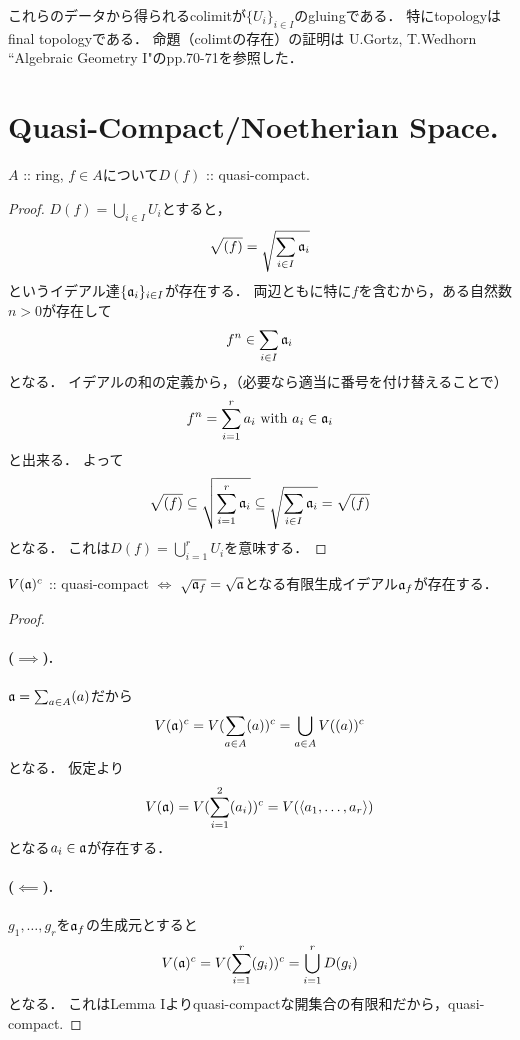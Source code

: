 \documentclass[a4paper]{jsarticle}
\begin{document}
    これらのデータから得られるcolimitが$\{U_i\}_{i \in I}$のgluingである．
    特にtopologyはfinal topologyである．
    命題（colimtの存在）の証明は
    U.Gortz, T.Wedhorn ``Algebraic Geometry I"のpp.70-71を参照した．

\section{Quasi-Compact/Noetherian Space.} %
    \begin{Lemma}[I]
        $A$ :: ring, $f \in A$について$D(f)$ :: quasi-compact.
    \end{Lemma}
    \begin{proof}
        $D(f)=\bigcup_{i \in I} U_i$とすると，
        \[ \sqrt{(f)}=\sqrt{\sum_{i \in I} \mathfrak{a}_i} \]
        というイデアル達$\{\mathfrak{a}_i\}_{i \in I}$が存在する．
        両辺ともに特に$f$を含むから，ある自然数$n>0$が存在して
        \[ f^n \in \sum_{i \in I} \mathfrak{a}_i \]
        となる．
        イデアルの和の定義から，（必要なら適当に番号を付け替えることで）
        \[ f^n=\sum_{i=1}^{r} a_i \text{ with } a_i \in \mathfrak{a}_i \]
        と出来る．
        よって
        \[
            \sqrt{(f)}
            \subseteq \sqrt{\sum_{i=1}^{r} \mathfrak{a}_i}
            \subseteq \sqrt{\sum_{i \in I} \mathfrak{a}_i}=\sqrt{(f)}
        \]
        となる．
        これは$D(f)=\bigcup_{i=1}^r U_i$を意味する．
    \end{proof}
    \begin{Lemma}[II]
        $V(\mathfrak{a})^c$ :: quasi-compact
        $\iff$
        $\sqrt{\mathfrak{a}_f}=\sqrt{\mathfrak{a}}$となる有限生成イデアル$\mathfrak{a}_f$が存在する．
    \end{Lemma}
    \begin{proof}
        \paragraph{($\implies$).}
        $\mathfrak{a}=\sum_{a \in A} (a)$だから
        \[ V(\mathfrak{a})^c=V(\sum_{a \in A} (a))^c=\bigcup_{a \in A} V((a))^c \]となる．
        仮定より
        \[ V(\mathfrak{a})=V(\sum_{i=1}^2 (a_i))^c=V(\langle a_1,\dots,a_r\rangle) \]
        となる$a_i \in \mathfrak{a}$が存在する．

        \paragraph{($\impliedby$).}
        $g_1,\dots,g_r$を$\mathfrak{a}_f$の生成元とすると
        \[ V(\mathfrak{a})^c=V(\sum_{i=1}^r (g_i))^c=\bigcup_{i=1}^r D(g_i) \]となる．
        これはLemma Iよりquasi-compactな開集合の有限和だから，quasi-compact.
    \end{proof}
\end{document}
